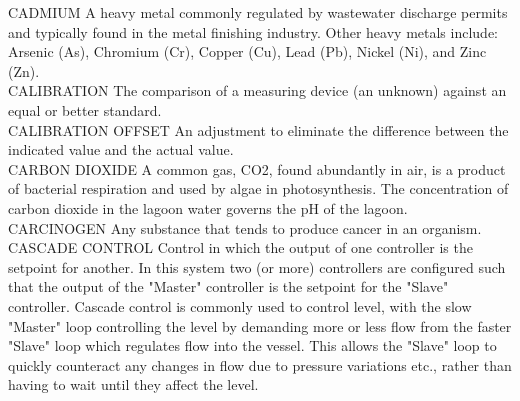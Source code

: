 CADMIUM
A heavy metal commonly regulated by wastewater discharge permits and typically found in the metal finishing industry.  Other heavy metals include: Arsenic (As), Chromium (Cr), Copper (Cu), Lead (Pb), Nickel (Ni), and Zinc (Zn).
\vspace{0.3cm}\\


CALIBRATION
The comparison of a measuring device (an unknown) against an equal or better standard.
\vspace{0.3cm}\\
CALIBRATION OFFSET
An adjustment to eliminate the difference between the indicated value and the actual value.
\vspace{0.3cm}\\











CARBON DIOXIDE
A common gas, CO2, found abundantly in air, is a product of bacterial respiration and used by algae in photosynthesis. The concentration of carbon dioxide in the lagoon water governs the pH of the lagoon.
\vspace{0.3cm}\\


CARCINOGEN
Any substance that tends to produce cancer in an organism.
\vspace{0.3cm}\\

CASCADE CONTROL
Control in which the output of one controller is the setpoint for another.  In this system two (or more) controllers are configured such that the output of the "Master" controller is the setpoint for the "Slave" controller. Cascade control is commonly used to control level, with the slow "Master" loop controlling the level by demanding more or less flow from the faster "Slave" loop which regulates flow into the vessel. This allows the "Slave" loop to quickly counteract any changes in flow due to pressure variations etc., rather than having to wait until they affect the level.
\vspace{0.3cm}\\

